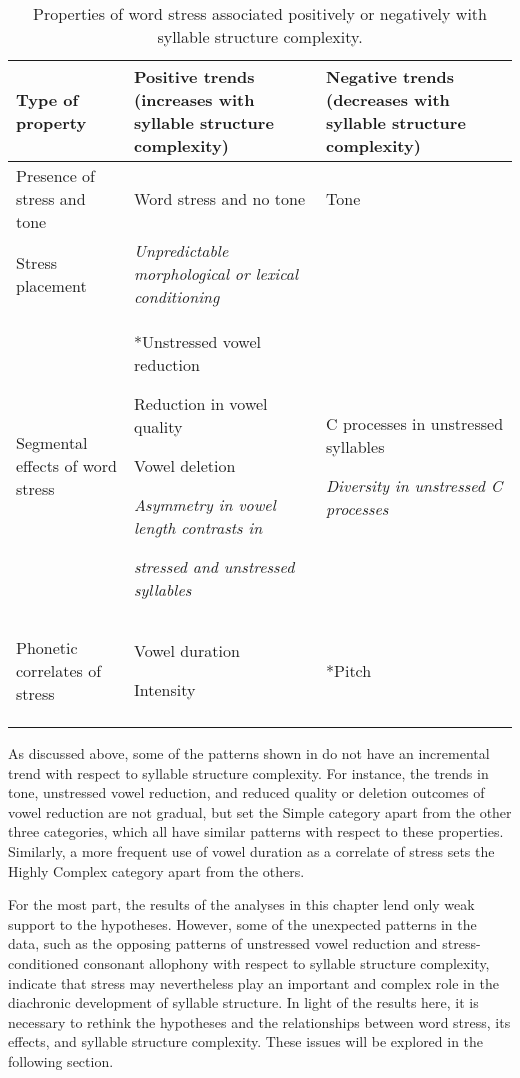 \begin{table}
\begin{tabularx}{\textwidth}{QQQ}
\lsptoprule
{Type of property}  & {Positive trends} (increases with syllable structure complexity)  & {Negative trends} (decreases with syllable structure complexity)\\\midrule
{Presence of stress and tone} & Word stress and no tone & Tone\\
{Stress placement} & \textit{Unpredictable morphological or lexical conditioning}\\
{Segmental effects of word stress} & *Unstressed vowel reduction

Reduction in vowel quality

Vowel deletion

\textit{Asymmetry in vowel length contrasts in} 

     \textit{stressed and unstressed syllables} & C processes in unstressed syllables

\textit{Diversity in unstressed C processes}\\
{Phonetic correlates of stress} & Vowel duration

Intensity & *Pitch\\
\lspbottomrule
\end{tabularx}
\caption{\label{tab:5.14}Properties of word stress associated positively or negatively with syllable structure complexity.}
\end{table}

  As discussed above, some of the patterns shown in  do not have an incremental trend with respect to syllable structure complexity. For instance, the trends in tone, unstressed vowel reduction, and reduced quality or deletion outcomes of vowel reduction are not gradual, but set the Simple category apart from the other three categories, which all have similar patterns with respect to these properties. Similarly, a more frequent use of vowel duration as a correlate of stress sets the Highly Complex category apart from the others.

  For the most part, the results of the analyses in this chapter lend only weak support to the hypotheses. However, some of the unexpected patterns in the data, such as the opposing patterns of unstressed vowel reduction and stress-conditioned consonant allophony with respect to syllable structure complexity, indicate that stress may nevertheless play an important and complex role in the diachronic development of syllable structure. In light of the results here, it is necessary to rethink the hypotheses and the relationships between word stress, its effects, and syllable structure complexity. These issues will be explored in the following section.

